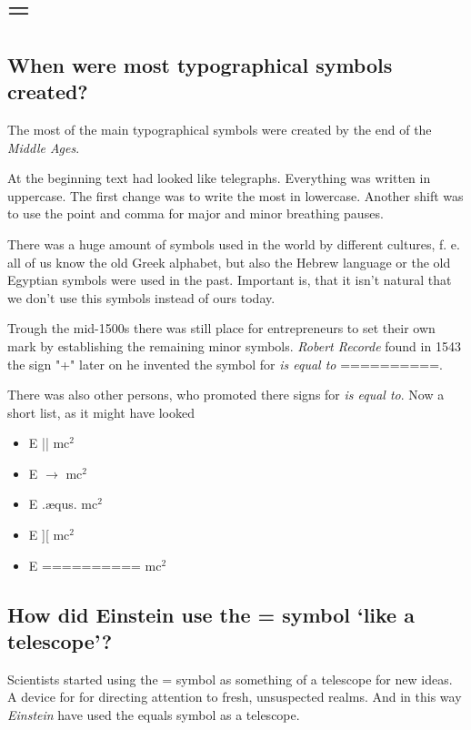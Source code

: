 %

\section{=}

\subsection*{When were most typographical symbols created?}
The most of the main typographical symbols were created by the end of the \emph{Middle Ages}.

At the beginning text had looked like telegraphs. Everything was written in uppercase. The first change was to write the most in lowercase. Another shift was to use the point and comma for major and minor breathing pauses.

There was a huge amount of symbols used in the world by different cultures, f. e. all of us know the old Greek alphabet, but also the Hebrew language or the old Egyptian symbols were used in the past. Important is, that it isn't natural that we don't use this symbols instead of ours today. 

Trough the mid-1500s there was still place for entrepreneurs to set their own mark by establishing the remaining minor symbols. \emph{Robert Recorde} found in 1543 the sign "+" later on he invented the symbol for \emph{is equal to} ==========.

There was also other persons, who promoted there signs for \emph{is equal to}. Now a short list, as it might have looked
\begin{itemize}
\item E || mc$^2$
\item E $\longrightarrow$ mc$^2$
\item E .\ae qus. mc$^2$
\item E \big]\big[ mc$^2$
\item E ========== mc$^2$
\end{itemize}


\subsection*{How did Einstein use the = symbol ‘like a telescope’?}
Scientists started using the = symbol as something of a telescope for new ideas. A device for for directing attention to fresh, unsuspected realms. And in this way \emph{Einstein} have used the equals symbol as a telescope.